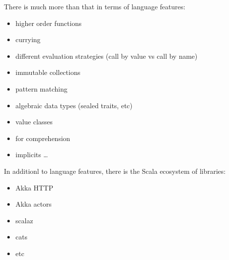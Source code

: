 \documentclass[10pt]{beamer}
\providecommand{\eg}{e.\,g.}
\begin{document}

\begin{frame}
There is much more than that in terms of language features:
\begin{itemize}
 \item higher order functions 
\item currying 
\item different evaluation strategies (call by value vs call by name) 
\item immutable collections 
\item pattern matching 
\item algebraic data types (sealed traits, etc)
\item value classes 
\item for comprehension 
\item implicits \ldots 
\end{itemize}
\end{frame}

\begin{frame}
In additionl to language features, there is the Scala ecosystem  of libraries:
\begin{itemize}
\item Akka HTTP
\item Akka actors
\item scalaz 
\item cats
\item etc
\end{itemize}
\end{frame}
\end{document}
